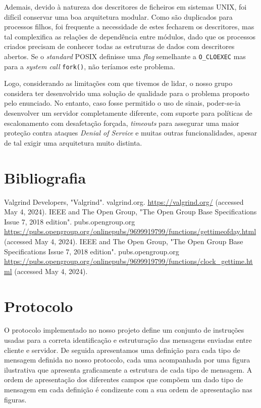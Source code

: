 \documentclass[11pt]{article}
\begin{document}
Ademais, devido à natureza dos descritores de ficheiros em sistemas UNIX, foi difícil conservar uma
boa arquitetura modular. Como são duplicados para processos filhos, foi frequente a necessidade de
estes fecharem os descritores, mas tal complexifica as relações de dependência entre módulos, dado
que os processos criados precisam de conhecer todas as estruturas de dados com descritores abertos.
Se o \emph{standard} POSIX definisse uma \emph{flag} semelhante a \texttt{O\_CLOEXEC} mas para a
\emph{system call} \texttt{fork()}, não teríamos este problema.

Logo, considerando as limitações com que tivemos de lidar, o nosso grupo considera ter desenvolvido
uma solução de qualidade para o problema proposto pelo enunciado. No entanto, caso fosse permitido o
uso de sinais, poder-se-ia desenvolver um servidor completamente diferente, com suporte para
políticas de escalonamento com desafetação forçada, \emph{timeouts} para assegurar uma maior
proteção contra ataques \emph{Denial of Service} e muitas outras funcionalidades, apesar de tal
exigir uma arquitetura muito distinta.

\section{Bibliografia}
\def\refname{}
\vspace{-1.5cm}
\begin{thebibliography}{9}
         Valgrind Developers, "Valgrind". valgrind.org.
         \url{https://valgrind.org/}
         (accessed May 4, 2024).
        IEEE and The Open Group, "The Open Group Base Specifications Issue 7, 2018 edition".
        pubs.opengroup.org
        \url{https://pubs.opengroup.org/onlinepubs/9699919799/functions/gettimeofday.html}
        (accessed May 4, 2024).
        IEEE and The Open Group, "The Open Group Base Specifications Issue 7, 2018 edition".
        pubs.opengroup.org
        \url{https://pubs.opengroup.org/onlinepubs/9699919799/functions/clock_gettime.html}
        (accessed May 4, 2024).
\end{thebibliography}

\section{Protocolo}

O protocolo implementado no nosso projeto define um conjunto de instruções usadas para a correta
identificação e estruturação das mensagens enviadas entre cliente e servidor. De seguida
apresentamos uma definição para cada tipo de mensagem definida no nosso protocolo, cada uma
acompanhada por uma figura ilustrativa que apresenta graficamente a estrutura de cada tipo de
mensagem. A ordem de apresentação dos diferentes campos que compõem um dado tipo de mensagem em cada
definição é condizente com a sua ordem de apresentação nas figuras.
\end{document}
